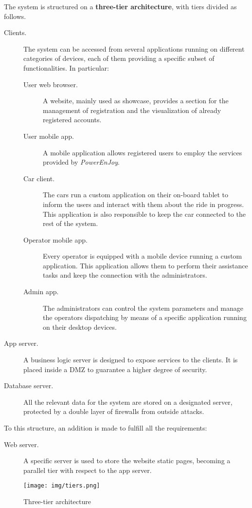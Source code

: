 The system is structured on a \textbf{three-tier architecture}, with tiers divided as follows.
\begin{description}
	\item[Clients.] The system can be accessed from several applications running on different categories of devices, each of them providing a specific subset of functionalities. In particular:
	\begin{description}
		\item[User web browser.] A website, mainly used as showcase, provides a section for the management of registration and the visualization of already registered accounts.
		\item[User mobile app.] A mobile application allows registered users to employ the services provided by \textit{PowerEnJoy}.
		\item[Car client.] The cars run a custom application on their on-board tablet to inform the users and interact with them about the ride in progress. This application is also responsible to keep the car connected to the rest of the system.
		\item[Operator mobile app.] Every operator is equipped with a mobile device running a custom application. This application allows them to perform their assistance tasks and keep the connection with the administrators.
		\item[Admin app.] The administrators can control the system parameters and manage the operators dispatching by means of a specific application running on their desktop devices.
	\end{description}
	\item[App server.] A business logic server is designed to expose services to the clients. It is placed inside a DMZ to guarantee a higher degree of security.
	\item[Database server.] All the relevant data for the system are stored on a designated server, protected by a double layer of firewalls from outside attacks.
\end{description}
To this structure, an addition is made to fulfill all the requirements:
	\begin{description}
		\item[Web server.] A specific server is used to store the website static pages, becoming a parallel tier with respect to the app server.
	\end{description}

\begin{figure}[h]
	\texttt{[image: img/tiers.png]} %
	\caption{Three-tier architecture}
\end{figure}
\FloatBarrier

